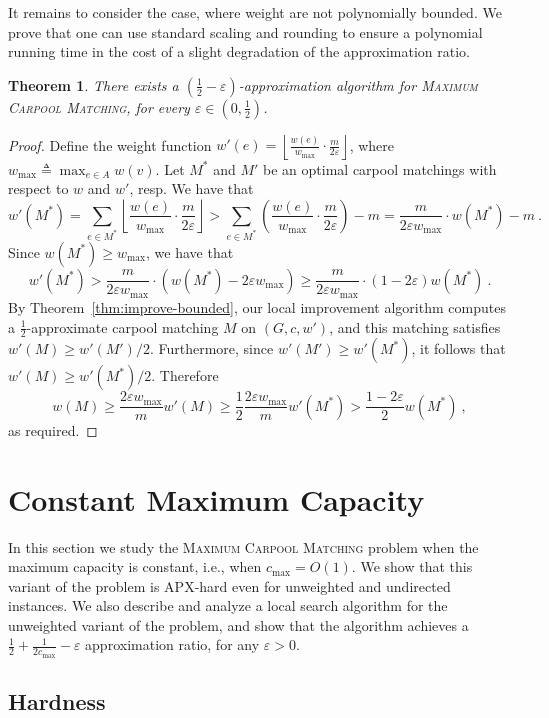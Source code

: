 \documentclass[11pt]{article}
\newtheorem{theorem}{Theorem}
\newcommand{\floor}[1]{\left\lfloor #1 \right\rfloor}
\newcommand{\paren}[1]{\left( #1 \right)}
\newcommand{\eqdf}{\triangleq}
\newcommand{\half}{\frac{1}{2}}
\newcommand{\inv}[1]{\frac{1}{#1}}
\newcommand{\carpool}{\textsc{Maximum Carpool Matching}\xspace}
\newcommand{\cmax}{c_{\max}}
\newcommand{\eps}{\varepsilon}
\begin{document}
It remains to consider the case, where weight are not polynomially
bounded.  We prove that one can use standard scaling and rounding to
ensure a polynomial running time in the cost of a slight degradation
of the approximation ratio.

\begin{theorem}
\label{thm:improve}
There exists a $(\half-\eps)$-approximation algorithm for \carpool,
for every $\eps \in (0,\half)$.
\end{theorem}
\begin{proof}%
Define the weight function $w'(e)
= \floor{\frac{w(e)}{w_{\max}} \cdot \frac{m}{2\eps}}$, where
$w_{\max} \eqdf \max_{e \in A} w(v)$.
%
Let $M^*$ and $M'$ be an optimal carpool matchings with respect to $w$
and $w'$, resp.  We have that
\[
w'(M^*)
=    \sum_{e \in M^*} \floor{\frac{w(e)}{w_{\max}} \cdot \frac{m}{2\eps}}
>    \sum_{e \in M^*} \paren{ \frac{w(e)}{w_{\max}} \cdot \frac{m}{2\eps} } - m
=    \frac{m}{2\eps w_{\max}} \cdot w(M^*) - m
~.
\]
Since $w(M^*) \geq w_{\max}$, we have that 
\[
w'(M^*)
>    \frac{m}{2\eps w_{\max}} \cdot (w(M^*) - 2\eps w_{\max})
\geq \frac{m}{2\eps w_{\max}} \cdot (1 - 2\eps) w(M^*)
~.
\]
By Theorem~\ref{thm:improve-bounded}, our local improvement algorithm computes a
$\half$-approximate carpool matching $M$ on $(G, c, w')$, and this
matching satisfies $w'(M) \geq w'(M')/2$.  Furthermore, since
$w'(M') \geq w'(M^*)$, it follows that $w'(M) \geq w'(M^*)/2$.
Therefore
\[
w(M)
\geq \frac{2\eps w_{\max}}{m} w'(M) 
\geq \frac{1}{2} \frac{2\eps w_{\max}}{m} w'(M^*)
>    \frac{1-2\eps}{2} w(M^*)
~,
\]
as required.
\end{proof}



\section{Constant Maximum Capacity}
\label{sec:cmax}
In this section we study the \carpool problem when the maximum
capacity is constant, i.e., when $\cmax = O(1)$.  We show that this
variant of the problem is APX-hard even for unweighted and undirected
instances.  We also describe and analyze a local search algorithm for
the unweighted variant of the problem, and show that the algorithm
achieves a $\half + \inv{2\cmax} - \eps$ approximation ratio, for any
$\varepsilon > 0$.


\subsection{Hardness}
\label{sec:hardness}
\end{document}
